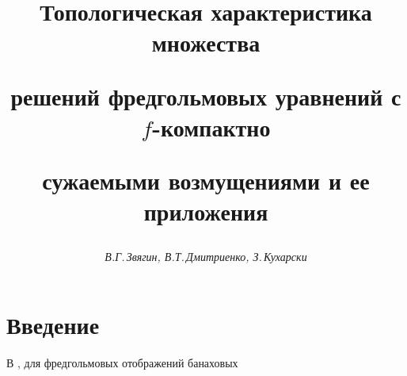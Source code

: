 \renewcommand{\thenotenonum}{}












\setcounter{page}{36}















\author{\it В.Г.\,Звягин, В.Т.\,Дмитриенко, З.\,Кухарски}




\title{Топологическая характеристика множества


решений фредгольмовых уравнений с $f$-компактно 


сужаемыми возмущениями и ее приложения}





\date{}




\pagestyle{plain} %







\maketitle


\label{begin}





\section*{Введение}





В \cite{1}, \cite{2} для фредгольмовых отображений банаховых


